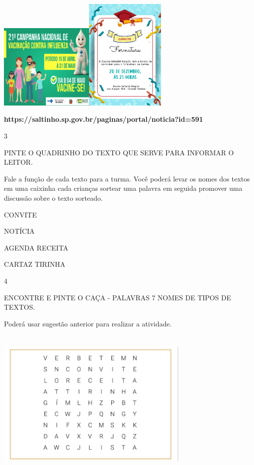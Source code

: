 {{{{\includegraphics[width=1.80556in,height=1.63403in]{media/image100.png}\includegraphics[width=1.51458in,height=2.14444in]{media/image103.png}

\textbf{https://saltinho.sp.gov.br/paginas/portal/noticia?id=591}

\num{3}

PINTE O QUADRINHO DO TEXTO QUE SERVE PARA INFORMAR O LEITOR.

Fale a função de cada texto para a turma. Você poderá levar os nomes dos
textos em uma caixinha cada crianças sortear uma palavra em seguida
promover uma discussão sobre o texto sorteado.

CONVITE

NOTÍCIA

AGENDA RECEITA

CARTAZ TIRINHA

\num{4}

ENCONTRE E PINTE O CAÇA - PALAVRAS 7 NOMES DE TIPOS DE TEXTOS.

Poderá usar sugestão anterior para realizar a atividade.

\includegraphics[width=3.68829in,height=2.89552in]{media/image104.jpeg}

}}}}
